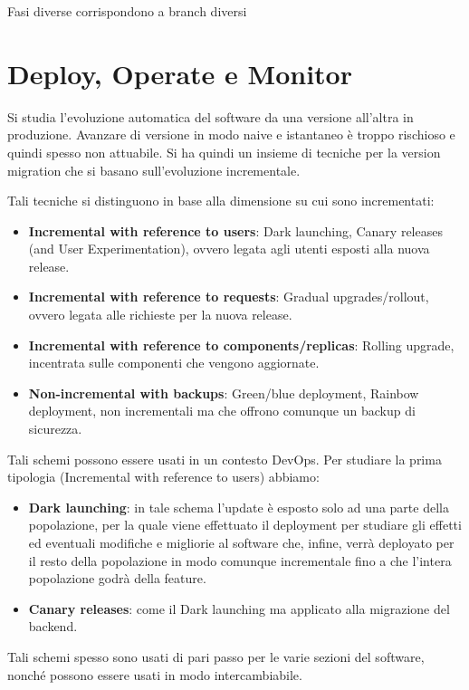 Fasi diverse corrispondono a branch diversi
\section{Deploy, Operate e Monitor}
Si studia l'evoluzione automatica del software da una versione all'altra in
produzione. Avanzare di versione in modo naive e istantaneo è troppo rischioso e
quindi spesso non attuabile. Si ha quindi un insieme di tecniche per la version
migration che si basano sull'evoluzione incrementale.

Tali tecniche si distinguono in base alla dimensione su cui sono incrementati:
\begin{itemize}
      \item \textbf{Incremental with reference to users}: Dark launching, Canary
            releases (and User Experimentation), ovvero legata agli utenti esposti
            alla nuova release.
      \item \textbf{Incremental with reference to requests}: Gradual upgrades/rollout,
            ovvero legata alle richieste per la nuova release.
      \item \textbf{Incremental with reference to components/replicas}: Rolling
            upgrade, incentrata sulle componenti che vengono aggiornate.
      \item \textbf{Non-incremental with backups}: Green/blue deployment,
            Rainbow deployment, non incrementali ma che offrono comunque un backup
            di sicurezza.
\end{itemize}
Tali schemi possono essere usati in un contesto DevOps. Per studiare la prima
tipologia (Incremental with reference to users) abbiamo:
\begin{itemize}
      \item \textbf{Dark launching}: in tale schema l'update è esposto solo ad una
            parte della popolazione, per la quale viene effettuato il deployment
            per studiare gli effetti ed eventuali modifiche e migliorie al
            software che, infine, verrà deployato per il resto della popolazione
            in modo comunque incrementale fino a che l'intera popolazione godrà
            della feature.
      \item \textbf{Canary releases}: come il Dark launching ma applicato alla
            migrazione del backend.
\end{itemize}
Tali schemi spesso sono usati di pari passo per le varie sezioni del software,
nonché possono essere usati in modo intercambiabile.

